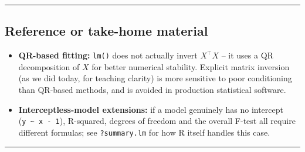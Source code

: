 \documentclass[11pt]{article}
\newenvironment{Shaded}{\begin{snugshade}}{\end{snugshade}}
\newcommand{\AttributeTok}[1]{\textcolor[rgb]{0.13,0.29,0.53}{#1}}
\newcommand{\CommentTok}[1]{\textcolor[rgb]{0.56,0.35,0.01}{\textit{#1}}}
\newcommand{\ConstantTok}[1]{\textcolor[rgb]{0.56,0.35,0.01}{#1}}
\newcommand{\DecValTok}[1]{\textcolor[rgb]{0.00,0.00,0.81}{#1}}
\newcommand{\FunctionTok}[1]{\textcolor[rgb]{0.13,0.29,0.53}{\textbf{#1}}}
\newcommand{\NormalTok}[1]{#1}
\newcommand{\OtherTok}[1]{\textcolor[rgb]{0.56,0.35,0.01}{#1}}
\newcommand{\SpecialCharTok}[1]{\textcolor[rgb]{0.81,0.36,0.00}{\textbf{#1}}}
\newcommand{\StringTok}[1]{\textcolor[rgb]{0.31,0.60,0.02}{#1}}
\providecommand{\tightlist}{%
  \setlength{\itemsep}{0pt}\setlength{\parskip}{0pt}}
\begin{document}
\begin{Shaded}
\end{Shaded}

\begin{center}\rule{0.5\linewidth}{0.5pt}\end{center}

\hypertarget{reference-or-take-home-material}{%
\subsection{Reference or take-home
material}\label{reference-or-take-home-material}}

\begin{itemize}
\tightlist
\item
  \textbf{QR-based fitting:} \texttt{lm()} does not actually invert
  \(X^\top X\) -- it uses a QR decomposition of \(X\) for better
  numerical stability. Explicit matrix inversion (as we did today, for
  teaching clarity) is more sensitive to poor conditioning than QR-based
  methods, and is avoided in production statistical software.
\item
  \textbf{Interceptless-model extensions:} if a model genuinely has no
  intercept (\texttt{y\ \textasciitilde{}\ x\ -\ 1}), R-squared, degrees
  of freedom and the overall F-test all require different formulas; see
  \texttt{?summary.lm} for how R itself handles this case.
\end{itemize}

\begin{center}\rule{0.5\linewidth}{0.5pt}\end{center}
\end{document}
